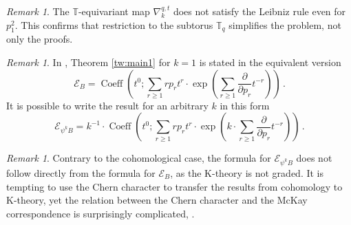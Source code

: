 \documentclass[12pt,a4paper]{amsart}
\theoremstyle{plain}
\theoremstyle{definition}
\theoremstyle{remark}
\newtheorem{rem}[tw]{Remark}
\newcommand{\TT}{\mathbb{T}}
\newcommand{\Tq}{{\mathbb{T}_q}}
\newcommand{\E}{\mathcal{E}}
\begin{document}
\begin{rem}
	The $\TT$-equivariant map $\nabla_k^{q,t}$ does not satisfy the Leibniz rule even for $p_1^2$.
	This confirms that restriction to the subtorus $\Tq$ simplifies the problem, not only the proofs.
\end{rem}
\begin{rem}
	In \cite{Boissiere}, Theorem \ref{tw:main1} for $k=1$ is stated in the equivalent version
	$$
	\E_B=\operatorname{Coeff}\left(t^0;\sum_{r\ge 1}rp_rt^r\cdot \exp\left(\sum_{r\ge 1}\frac{\partial}{\partial p_r}t^{-r}\right)\right)\,.
	$$
	It is possible to write the result for an arbitrary $k$ in this form
	$$
	\E_{\psi^kB}=k^{-1}\cdot\operatorname{Coeff}\left(t^0;\sum_{r\ge 1}rp_rt^r\cdot \exp\left(k\cdot\sum_{r\ge 1}\frac{\partial}{\partial p_r}t^{-r}\right)\right)\,.
	$$
\end{rem}

\begin{rem}
	Contrary to the cohomological case, the formula for $\E_{\psi^kB}$ does not follow directly from the formula for $\E_{B}$, as the K-theory is not graded. It is tempting to use the Chern character to transfer the results from cohomology to K-theory, yet the relation between the Chern character and the McKay correspondence is surprisingly complicated, \cite[Theorem 1.1]{Boissiere2}.
\end{rem}
\end{document}
